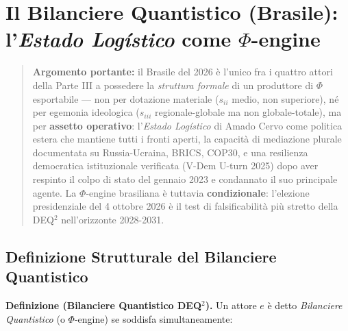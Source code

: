 \chapter{\texorpdfstring{Il Bilanciere Quantistico (Brasile):
l'\emph{Estado Logístico} come
\(\Phi\)-engine}{Il Bilanciere Quantistico (Brasile): l'Estado Logístico come \textbackslash Phi-engine}}\label{il-bilanciere-quantistico-brasile-lestado-loguxedstico-come-phi-engine}

\begin{quote}
\textbf{Argomento portante:} il Brasile del 2026 è l'unico fra i quattro
attori della Parte III a possedere la \emph{struttura formale} di un
produttore di \(\Phi\) esportabile --- non per dotazione materiale
(\(s_{ii}\) medio, non superiore), né per egemonia ideologica
(\(s_{iii}\) regionale-globale ma non globale-totale), ma per
\textbf{assetto operativo}: l'\emph{Estado Logístico} di Amado Cervo
come politica estera che mantiene tutti i fronti aperti, la capacità di
mediazione plurale documentata su Russia-Ucraina, BRICS, COP30, e una
resilienza democratica istituzionale verificata (V-Dem U-turn 2025) dopo
aver respinto il colpo di stato del gennaio 2023 e condannato il suo
principale agente. La \(\Phi\)-engine brasiliana è tuttavia
\textbf{condizionale}: l'elezione presidenziale del 4 ottobre 2026 è il
test di falsificabilità più stretto della DEQ$^2$ nell'orizzonte 2028-2031.
\end{quote}



\section{Definizione Strutturale del Bilanciere
Quantistico}\label{definizione-strutturale-del-bilanciere-quantistico}

\Hypoth{} \textbf{Definizione (Bilanciere Quantistico DEQ$^2$).} Un attore
\(e\) è detto \emph{Bilanciere Quantistico} (o \(\Phi\)-engine) se
soddisfa simultaneamente:

